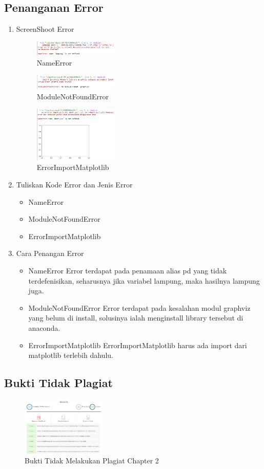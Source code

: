 \subsection{Penanganan Error}
\begin{enumerate}
	\item ScreenShoot Error
	\begin{figure}[H]
		\includegraphics[width=4cm]{figures/1174017/2/errorname.PNG}
		\centering
		\caption{NameError}
	\end{figure}
	\begin{figure}[H]
		\includegraphics[width=4cm]{figures/1174017/2/notmoduleerror.PNG}
		\centering
		\caption{ModuleNotFoundError}
	\end{figure}
	\begin{figure}[H]
		\includegraphics[width=4cm]{figures/1174017/2/errorimportmatplotlib.PNG}
		\centering
		\caption{ErrorImportMatplotlib}
	\end{figure}
	\item Tuliskan Kode Error dan Jenis Error
	\begin{itemize}
		\item NameError
		\item ModuleNotFoundError
		\item ErrorImportMatplotlib
	\end{itemize}

	\item Cara Penangan Error
	\begin{itemize}
		\item NameError
		\hfill\break
		Error terdapat pada penamaan alias pd yang tidak terdefenisikan, seharusnya jika variabel lampung, maka hasilnya lampung juga.
		\item ModuleNotFoundError
		\hfill\break
		Error terdapat pada kesalahan modul graphviz yang belum di install, solusinya ialah menginstall library tersebut di anaconda.
		\item ErrorImportMatplotlib
		\hfill\break
		ErrorImportMatplotlib harus ada import dari matplotlib terlebih dahulu.
	\end{itemize}
\end{enumerate}

\subsection{Bukti Tidak Plagiat}
\begin{figure}[H]
\centering
	\includegraphics[width=4cm]{figures/1174017/2/bukanplagiat.PNG}
	\caption{Bukti Tidak Melakukan Plagiat Chapter 2}
\end{figure}